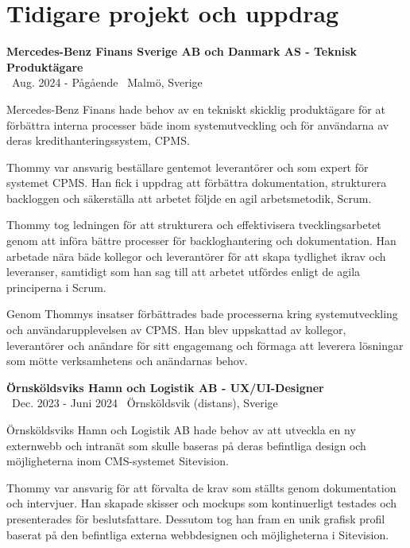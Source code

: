 \documentclass[a4paper,10pt]{article}
\begin{document}
\vspace{0.5cm}

\section*{Tidigare projekt och uppdrag}

\textbf{Mercedes-Benz Finans Sverige AB och Danmark AS - Teknisk Produktägare}\\
\normalsize \faCalendar \ Aug. 2024 - Pågående \quad \faMapMarker \ Malmö, Sverige

Mercedes-Benz Finans hade behov av en tekniskt skicklig produktägare för at förbättra interna processer bäde inom systemutveckling och för användarna av deras kredithanteringssystem, CPMS.

Thommy var ansvarig beställare gentemot leverantörer och som expert för systemet CPMS. Han fick i uppdrag att förbättra dokumentation, strukturera backloggen och säkerställa att arbetet följde en agil arbetsmetodik, Scrum.

Thommy tog ledningen för att strukturera och effektivisera tvecklingsarbetet genom att införa bättre processer för backloghantering och dokumentation. Han arbetade nära bäde kollegor och leverantörer för att skapa tydlighet ikrav och leveranser, samtidigt som han sag till att arbetet utfördes enligt de agila principerna i Scrum.

Genom Thommys insatser förbättrades bade processerna kring systemutveckling och användarupplevelsen av CPMS. Han blev uppskattad av kollegor, leverantörer och anändare för sitt engagemang och förmaga att leverera lösningar som mötte verksamhetens och anändarnas behov.

\vspace{0.5cm}
\textbf{Örnsköldsviks Hamn och Logistik AB - UX/UI-Designer}\\
\normalsize \faCalendar \ Dec. 2023 - Juni 2024 \quad \faMapMarker \ Örnsköldsvik (distans), Sverige

Örnsköldsviks Hamn och Logistik AB hade behov av att utveckla en ny externwebb och intranät som skulle baseras på deras befintliga design och möjligheterna inom CMS-systemet Sitevision.

Thommy var ansvarig för att förvalta de krav som ställts genom dokumentation och intervjuer. Han skapade skisser och mockups som kontinuerligt testades och presenterades för beslutsfattare. Dessutom tog han fram en unik grafisk profil baserat på den befintliga externa webbdesignen och möjligheterna i Sitevision.
\end{document}
